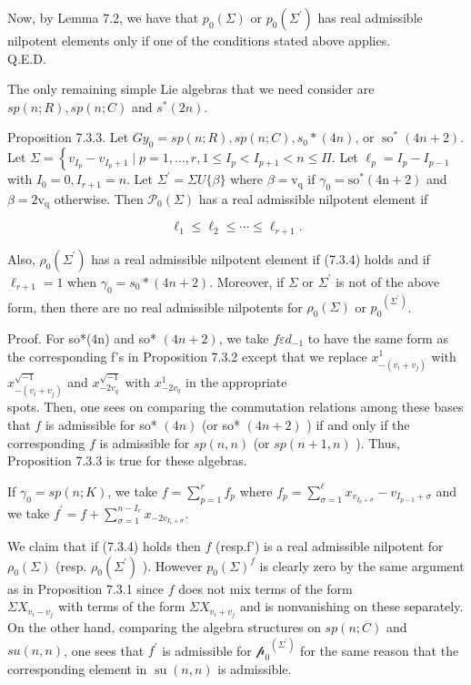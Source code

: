 \documentclass[10pt]{article}
\begin{document}
Now, by Lemma 7.2, we have that $p_{0}(\Sigma)$ or $p_{0}\left(\Sigma^{\prime}\right)$ has real admissible nilpotent elements only if one of the conditions stated above applies.\\
Q.E.D.

The only remaining simple Lie algebras that we need consider are $s p(n ; R), s p(n ; C)$ and $s^{*}(2 n)$.

Proposition 7.3.3. Let $G y_{0}=s p(n ; R), s p(n ; C), s_{0} *(4 n)$, or $\operatorname{so}^{*}(4 n+2)$. Let $\Sigma=\left\{v_{I_{p}}-v_{I_{p}+1} \mid p=1, \ldots, r, 1 \leq I_{p}<I_{p+1}<n \leq \Pi\right.$. Let $\ell_{p}=I_{p}-I_{p-1}$ with $I_{0}=0, I_{r+1}=n$. Let $\Sigma^{\prime}=\Sigma U\{\beta\}$ where $\beta=\mathrm{v}_{\mathrm{q}}$ if $\gamma_{0}=\mathrm{so}^{*}(4 \mathrm{n}+2)$ and $\beta=2 \mathrm{v}_{\mathrm{q}}$ otherwise. Then $\mathcal{P}_{0}(\Sigma)$ has a real admissible nilpotent element if


\begin{equation*}
\ell_{1} \leq \ell_{2} \leq \cdots \leq \ell_{r+1} . \tag{7.3.4}
\end{equation*}


Also, $\rho_{0}\left(\Sigma^{\prime}\right)$ has a real admissible nilpotent element if (7.3.4) holds and if $\ell_{r+1}=1$ when $\gamma_{0}=s_{0} *(4 n+2)$. Moreover, if $\Sigma$ or $\Sigma^{\prime}$ is not of the above form, then there are no real admissible nilpotents for $\rho_{0}(\Sigma)$ or $p_{0}{ }^{\left(\Sigma^{\prime}\right)}$.

Proof. For so*(4n) and so* $(4 n+2)$, we take $f \varepsilon d_{-1}$ to have the same form as the corresponding f's in Proposition 7.3.2 except that we replace $x_{-\left(v_{i}+v_{j}\right)}^{1}$ with $x_{-\left(v_{i}+v_{j}\right)}^{\sqrt{-1}}$ and $x_{-2 v_{q}}^{\sqrt{-1}}$ with $x_{-2 v_{q}}^{1}$ in the appropriate\\
spots. Then, one sees on comparing the commutation relations among these bases that $f$ is admissible for so* $(4 n)$ (or so* $(4 n+2)$ ) if and only if the corresponding $f$ is admissible for $s p(n, n)$ (or $s p(n+1, n)$ ). Thus, Proposition 7.3.3 is true for these algebras.

If $\gamma_{0}=s p(n ; K)$, we take $f=\sum_{p=1}^{r} f_{p}$ where $f_{p}=\sum_{\sigma=1}^{\ell} x_{v_{I_{p}+\sigma}}-v_{I_{p-1}+\sigma}$ and we take $f^{\prime}=f+\sum_{\sigma=1}^{n-I_{r}} x_{-2 v_{I_{r}+\sigma}}$.

We claim that if (7.3.4) holds then $f$ (resp.f') is a real admissible nilpotent for $\rho_{0}(\Sigma)$ (resp. $\rho_{0}\left(\Sigma^{\prime}\right)$ ). However $p_{0}(\Sigma)^{f}$ is clearly zero by the same argument as in Proposition 7.3.1 since $f$ does not mix terms of the form\\
$\Sigma X_{v_{i}-v_{j}}$ with terms of the form $\Sigma X_{v_{i}+v_{j}}$ and is nonvanishing on these separately. On the other hand, comparing the algebra structures on $s p(n ; C)$ and $s u(n, n)$, one sees that $f^{\prime}$ is admissible for $\mathcal{p}_{0}{ }^{\left(\Sigma^{\prime}\right)}$ for the same reason that the corresponding element in $\operatorname{su}(n, n)$ is admissible.
\end{document}
